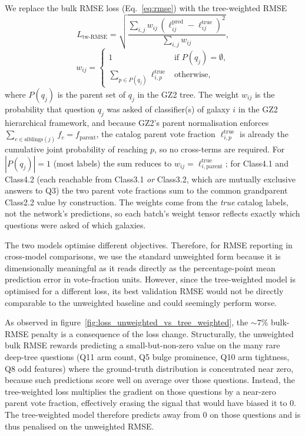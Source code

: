 \documentclass[10pt,preprint2]{aastex}
\begin{document}
We replace the bulk RMSE loss (Eq.~\ref{eq:rmse}) with the tree-weighted RMSE
\begin{equation}
  L_{\mathrm{tw\text{-}RMSE}} = \sqrt{\frac{\sum_{i, j} w_{ij}\,(\ell^{\mathrm{pred}}_{ij} - \ell^{\mathrm{true}}_{ij})^2}{\sum_{i, j} w_{ij}}},
  \label{eq:tree-weighted-loss}
\end{equation}
\begin{equation}
  w_{ij} =
  \begin{cases}
    1 & \text{if } P(q_j) = \emptyset, \\
    \displaystyle \sum_{p \in P(q_j)} \ell^{\mathrm{true}}_{i, p} & \text{otherwise},
  \end{cases}
  \label{eq:tree-weights}
\end{equation}
where $P(q_j)$ is the parent set of $q_j$ in the GZ2 tree. The weight $w_{ij}$ is the probability that question $q_j$ was asked of classifier(s) of galaxy $i$ in the GZ2 hierarchical framework, and because GZ2's parent normalisation enforces $\sum_{c \in \mathrm{siblings}(j)} f_c = f_{\mathrm{parent}}$, the catalog parent vote fraction $\ell^{\mathrm{true}}_{i, p}$ is already the cumulative joint probability of reaching $p$, so no cross-terms are required. For $|P(q_j)| = 1$ (most labels) the sum reduces to $w_{ij} = \ell^{\mathrm{true}}_{i, \mathrm{parent}}$; for Class4.1 and Class4.2 (each reachable from Class3.1 \emph{or} Class3.2, which are mutually exclusive answers to Q3) the two parent vote fractions sum to the common grandparent Class2.2 value by construction. The weights come from the \emph{true} catalog labels, not the network's predictions, so each batch's weight tensor reflects exactly which questions were asked of which galaxies. 

The two models optimise different objectives. Therefore, for RMSE reporting in cross-model comparisons, we use the standard unweighted form because it is dimensionally meaningful as it reads directly as the percentage-point mean prediction error in vote-fraction units. However, since the tree-weighted model is optimised for a different loss, its best validation RMSE would not be directly comparable to the unweighted baseline and could seemingly perform worse.

As observed in figure~\ref{fig:loss_unweighted_vs_tree_weighted}, the $\sim 7\%$ bulk-RMSE penalty is a consequence of the loss change. Structurally, the unweighted bulk RMSE rewards predicting a small-but-non-zero value on the many rare deep-tree questions (Q11 arm count, Q5 bulge prominence, Q10 arm tightness, Q8 odd features) where the ground-truth distribution is concentrated near zero, because such predictions score well on average over those questions. Instead, the tree-weighted loss multiplies the gradient on those questions by a near-zero parent vote fraction, effectively erasing the signal that would have biased it to 0. The tree-weighted model therefore predicts away from 0 on those questions and is thus penalised on the unweighted RMSE.
\end{document}
